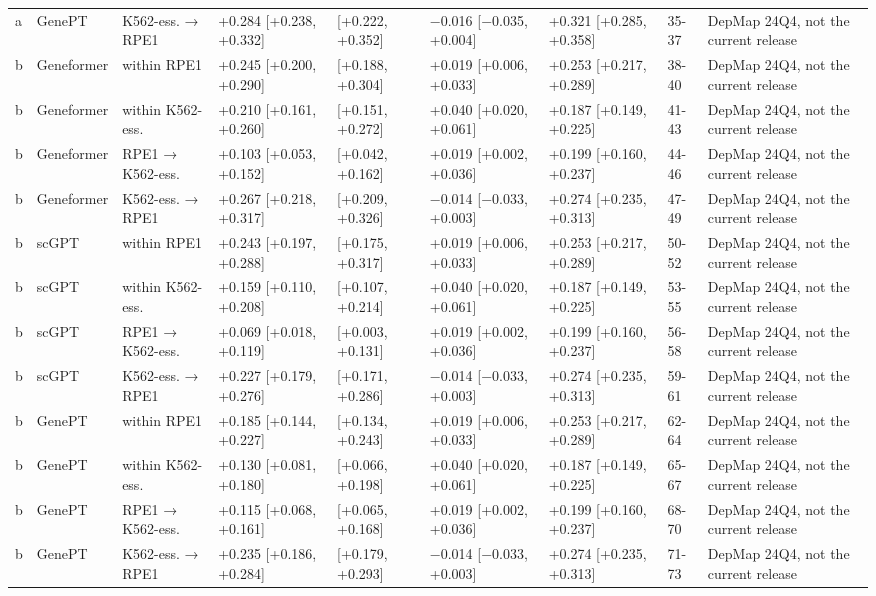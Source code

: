 \begin{tabular}{lllllllll}
a & GenePT & K562-ess. → RPE1 & +0.284 [+0.238, +0.332] & [+0.222, +0.352] & −0.016 [−0.035, +0.004] & +0.321 [+0.285, +0.358] & 35-37 & DepMap 24Q4, not the current release \\
b & Geneformer & within RPE1 & +0.245 [+0.200, +0.290] & [+0.188, +0.304] & +0.019 [+0.006, +0.033] & +0.253 [+0.217, +0.289] & 38-40 & DepMap 24Q4, not the current release \\
b & Geneformer & within K562-ess. & +0.210 [+0.161, +0.260] & [+0.151, +0.272] & +0.040 [+0.020, +0.061] & +0.187 [+0.149, +0.225] & 41-43 & DepMap 24Q4, not the current release \\
b & Geneformer & RPE1 → K562-ess. & +0.103 [+0.053, +0.152] & [+0.042, +0.162] & +0.019 [+0.002, +0.036] & +0.199 [+0.160, +0.237] & 44-46 & DepMap 24Q4, not the current release \\
b & Geneformer & K562-ess. → RPE1 & +0.267 [+0.218, +0.317] & [+0.209, +0.326] & −0.014 [−0.033, +0.003] & +0.274 [+0.235, +0.313] & 47-49 & DepMap 24Q4, not the current release \\
b & scGPT & within RPE1 & +0.243 [+0.197, +0.288] & [+0.175, +0.317] & +0.019 [+0.006, +0.033] & +0.253 [+0.217, +0.289] & 50-52 & DepMap 24Q4, not the current release \\
b & scGPT & within K562-ess. & +0.159 [+0.110, +0.208] & [+0.107, +0.214] & +0.040 [+0.020, +0.061] & +0.187 [+0.149, +0.225] & 53-55 & DepMap 24Q4, not the current release \\
b & scGPT & RPE1 → K562-ess. & +0.069 [+0.018, +0.119] & [+0.003, +0.131] & +0.019 [+0.002, +0.036] & +0.199 [+0.160, +0.237] & 56-58 & DepMap 24Q4, not the current release \\
b & scGPT & K562-ess. → RPE1 & +0.227 [+0.179, +0.276] & [+0.171, +0.286] & −0.014 [−0.033, +0.003] & +0.274 [+0.235, +0.313] & 59-61 & DepMap 24Q4, not the current release \\
b & GenePT & within RPE1 & +0.185 [+0.144, +0.227] & [+0.134, +0.243] & +0.019 [+0.006, +0.033] & +0.253 [+0.217, +0.289] & 62-64 & DepMap 24Q4, not the current release \\
b & GenePT & within K562-ess. & +0.130 [+0.081, +0.180] & [+0.066, +0.198] & +0.040 [+0.020, +0.061] & +0.187 [+0.149, +0.225] & 65-67 & DepMap 24Q4, not the current release \\
b & GenePT & RPE1 → K562-ess. & +0.115 [+0.068, +0.161] & [+0.065, +0.168] & +0.019 [+0.002, +0.036] & +0.199 [+0.160, +0.237] & 68-70 & DepMap 24Q4, not the current release \\
b & GenePT & K562-ess. → RPE1 & +0.235 [+0.186, +0.284] & [+0.179, +0.293] & −0.014 [−0.033, +0.003] & +0.274 [+0.235, +0.313] & 71-73 & DepMap 24Q4, not the current release \\
\bottomrule
\end{tabular}

